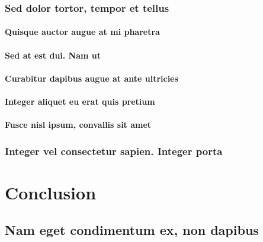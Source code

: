 \documentclass[%
  english,%
]{doctorate}
\begin{document}
\subsection{Sed dolor tortor, tempor et tellus}

\lipsum[1-8]

\subsubsection{Quisque auctor augue at mi pharetra}

\lipsum[1-8]

\subsubsection{Sed at est dui. Nam ut}

\lipsum[1-8]

\subsubsection{Curabitur dapibus augue at ante ultricies}

\lipsum[1-8]

\subsubsection{Integer aliquet eu erat quis pretium}

\lipsum[1-8]

\subsubsection{Fusce nisl ipsum, convallis sit amet}

\lipsum[1-8]

\subsection{Integer vel consectetur sapien. Integer porta}

\lipsum[1-8]




\chapter{Conclusion}

\lipsum[1-8]

\section{Nam eget condimentum ex, non dapibus}
\end{document}
